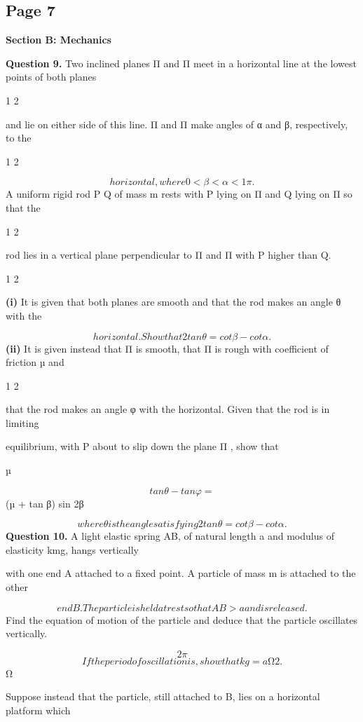 \documentclass[12pt]{article}
\begin{document}
\subsection*{Page 7}
\begin{flushleft}
\bigskip\textbf{Section B: Mechanics}\par
\bigskip\textbf{Question 9.} Two inclined planes Π and Π meet in a horizontal line at the lowest points of both planes\par
1 2\par
and lie on either side of this line. Π and Π make angles of α and β, respectively, to the\par
1 2\par
\[horizontal, where 0 < β < α < 1 \pi.\]
A uniform rigid rod P Q of mass m rests with P lying on Π and Q lying on Π so that the\par
1 2\par
rod lies in a vertical plane perpendicular to Π and Π with P higher than Q.\par
1 2\par
\textbf{(i)} It is given that both planes are smooth and that the rod makes an angle θ with the\par
\[horizontal. Show that 2 tan θ = cot β - cot α.\]
\textbf{(ii)} It is given instead that Π is smooth, that Π is rough with coefficient of friction µ and\par
1 2\par
that the rod makes an angle φ with the horizontal. Given that the rod is in limiting\par
equilibrium, with P about to slip down the plane Π , show that\par
µ\par
\[tan θ - tan φ =\]
(µ + tan β) sin 2β\par
\[where θ is the angle satisfying 2 tan θ = cot β - cot α.\]
\bigskip\textbf{Question 10.} A light elastic spring AB, of natural length a and modulus of elasticity kmg, hangs vertically\par
with one end A attached to a fixed point. A particle of mass m is attached to the other\par
\[end B. The particle is held at rest so that AB > a and is released.\]
Find the equation of motion of the particle and deduce that the particle oscillates vertically.\par
\[2\pi\]
\[If the period of oscillation is , show that kg = aΩ2.\]
Ω\par
Suppose instead that the particle, still attached to B, lies on a horizontal platform which\par

\end{flushleft}
\end{document}

